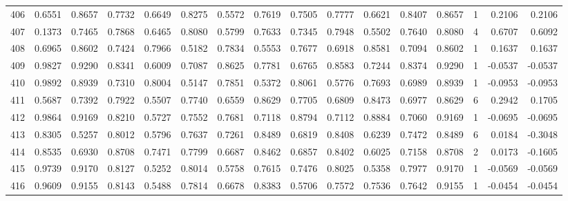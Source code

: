 \begin{tabular}{lrrrrrrrrrrrrrrr}
406 &      0.6551 &  0.8657 &  0.7732 &  0.6649 &  0.8275 &  0.5572 &  0.7619 &  0.7505 &  0.7777 &  0.6621 &   0.8407 &     0.8657 &      1 &                    0.2106 &                     0.2106 \\
407 &      0.1373 &  0.7465 &  0.7868 &  0.6465 &  0.8080 &  0.5799 &  0.7633 &  0.7345 &  0.7948 &  0.5502 &   0.7640 &     0.8080 &      4 &                    0.6707 &                     0.6092 \\
408 &      0.6965 &  0.8602 &  0.7424 &  0.7966 &  0.5182 &  0.7834 &  0.5553 &  0.7677 &  0.6918 &  0.8581 &   0.7094 &     0.8602 &      1 &                    0.1637 &                     0.1637 \\
409 &      0.9827 &  0.9290 &  0.8341 &  0.6009 &  0.7087 &  0.8625 &  0.7781 &  0.6765 &  0.8583 &  0.7244 &   0.8374 &     0.9290 &      1 &                   -0.0537 &                    -0.0537 \\
410 &      0.9892 &  0.8939 &  0.7310 &  0.8004 &  0.5147 &  0.7851 &  0.5372 &  0.8061 &  0.5776 &  0.7693 &   0.6989 &     0.8939 &      1 &                   -0.0953 &                    -0.0953 \\
411 &      0.5687 &  0.7392 &  0.7922 &  0.5507 &  0.7740 &  0.6559 &  0.8629 &  0.7705 &  0.6809 &  0.8473 &   0.6977 &     0.8629 &      6 &                    0.2942 &                     0.1705 \\
412 &      0.9864 &  0.9169 &  0.8210 &  0.5727 &  0.7552 &  0.7681 &  0.7118 &  0.8794 &  0.7112 &  0.8884 &   0.7060 &     0.9169 &      1 &                   -0.0695 &                    -0.0695 \\
413 &      0.8305 &  0.5257 &  0.8012 &  0.5796 &  0.7637 &  0.7261 &  0.8489 &  0.6819 &  0.8408 &  0.6239 &   0.7472 &     0.8489 &      6 &                    0.0184 &                    -0.3048 \\
414 &      0.8535 &  0.6930 &  0.8708 &  0.7471 &  0.7799 &  0.6687 &  0.8462 &  0.6857 &  0.8402 &  0.6025 &   0.7158 &     0.8708 &      2 &                    0.0173 &                    -0.1605 \\
415 &      0.9739 &  0.9170 &  0.8127 &  0.5252 &  0.8014 &  0.5758 &  0.7615 &  0.7476 &  0.8025 &  0.5358 &   0.7977 &     0.9170 &      1 &                   -0.0569 &                    -0.0569 \\
416 &      0.9609 &  0.9155 &  0.8143 &  0.5488 &  0.7814 &  0.6678 &  0.8383 &  0.5706 &  0.7572 &  0.7536 &   0.7642 &     0.9155 &      1 &                   -0.0454 &                    -0.0454 \\

\end{tabular}
